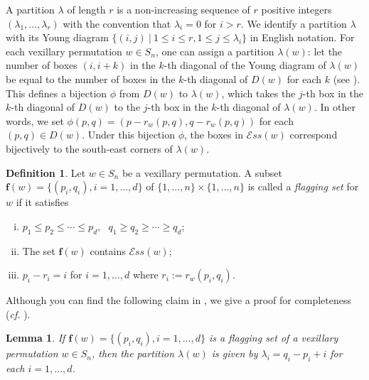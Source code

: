 \documentclass[12pt, reqno,sumlimits]{amsart}
\newtheorem{lem}[thm]{Lemma}
\theoremstyle{definition}
\newtheorem{defn}[thm]{Definition}
\numberwithin{equation}{section}
\newcommand{\Ess}{{\mathcal{E}ss}}
\newcommand{\bff}{{\mathbf f }}
\begin{document}
A partition $\lambda$ of length $r$ is a non-increasing sequence of $r$ positive integers $(\lambda_1,\dots,\lambda_r)$ with the convention that $\lambda_i=0$ for $i>r$. We identify a partition $\lambda$ with its Young diagram $\{(i,j) \ |\ 1\leq i\leq r, 1\leq j\leq \lambda_i\}$ in English notation. For each vexillary permutation $w \in S_n$, one can assign a partition $\lambda(w)$: let the number of boxes $(i,i+k)$ in the $k$-th diagonal of the Young diagram of $\lambda(w)$ be equal to the number of boxes in the $k$-th diagonal of $D(w)$ for each $k$ (see \cite{KnutsonMillerYong, KnutsonMillerYong2}). This defines a bijection $\phi$ from $D(w)$ to $\lambda(w)$, which takes the $j$-th box in the $k$-th diagonal of $D(w)$ to the $j$-th box in the $k$-th diagonal of $\lambda(w)$. In other words, we set $\phi(p,q) = (p-r_w(p,q), q-r_w(p,q))$ for each $(p,q)\in D(w)$. Under this bijection $\phi$, the boxes in $\Ess(w)$ correspond bijectively to the south-east corners of $\lambda(w)$.
\begin{defn}\label{lemVexFilling}
Let $w\in S_n$ be a vexillary permutation.  A subset $\bff(w)=\{(p_i,q_i),i=1,\dots,d\}$ of $\{1,\dots,n\}\times \{1,\dots,n\}$ is called a \emph{flagging set} for $w$ if it satisfies 
\begin{enumerate}[(i)]
\item $p_1\leq p_2 \leq \cdots \leq p_d, \ \ \ q_1\geq q_2 \geq \cdots \geq q_d$;
\item The set $\bff(w)$ contains $\Ess(w)$; 
\item $p_i - r_i = i$ for $i=1,\dots,d$ where $r_i:=r_w(p_i,q_i)$.
\end{enumerate}
\end{defn}
Although you can find the following claim in \cite{AndersonFulton, AndersonFulton2}, we give a proof for completeness ({\it cf.} \cite{FlagsFulton, MacdonaldNote}).
\begin{lem}
If $\bff(w)=\{(p_i,q_i),i=1,\dots,d\}$ is a flagging set of a vexillary permutation $w\in S_n$, then the partition $\lambda(w)$ is given by $\lambda_i = q_i-p_i +i$ for each $i=1,\dots, d$. %
\end{lem}
\end{document}
